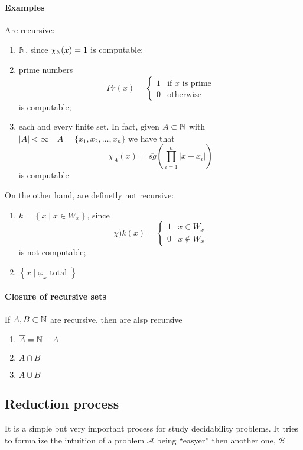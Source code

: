 \paragraph{Examples}
Are recursive:
\begin{enumerate}[label=(\alph*)]
\item $\mathbb{N}$, since $\chi_{\mathbb{N}} (x) = 1$ is computable;
\item prime numbers
  \[
    Pr(x) = \begin{cases}
      1 & \mbox{if $x$ is prime} \\
      0 & \mbox{otherwise}
    \end{cases}
  \]
  is computable;
\item each and every finite set. In fact, given $A \subset \mathbb{N}$ with
  $|A| < \infty \quad A = \{x_1, x_2, \dots, x_n\}$ we have that
  \[
    \chi_A(x) = \overline{sg}\left( \prod_{i=1}^n|x - x_i| \right)
  \]
  is computable
\end{enumerate}

On the other hand, are definetly not recursive:
\begin{enumerate}[label=(\alph*)]
\item $k = \left\{ x \; | \; x \in W_x \right\} $, since
  \[
    \chi){k(x)} = \begin{cases}
      1 & x \in W_x \\
      0 & x \notin W_x
    \end{cases}
  \]
  is not computable;
\item $\left\{ x \; | \; \varphi_x \mbox{ total } \right\} $
\end{enumerate}

\mbox{\\}

\paragraph{Closure of recursive sets}
If $A,B \subset \mathbb{N}$ are recursive, then are alsp recursive
\begin{enumerate}[label=\arabic*)]
\item $\overline{A} = \mathbb{N} - A$
\item $A \cap B$
\item $A \cup B$
\end{enumerate}

\subsection{Reduction process}
It is a simple but very important process for study decidability
problems. It tries to formalize the intuition of a problem
$\mathcal{A}$ being ``easyer'' then another one, $\mathcal{B}$

